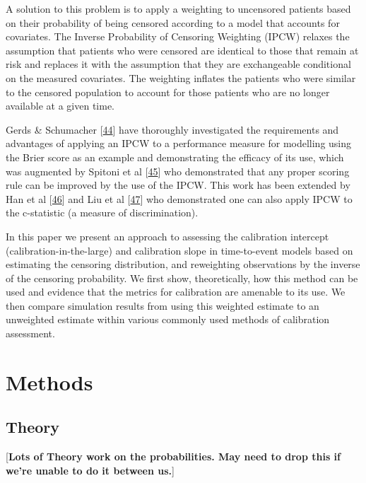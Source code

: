 \documentclass[12pt,PhD,twoside,openright]{muthesis}
\begin{document}
A solution to this problem is to apply a weighting to uncensored patients based on their probability of being censored according to a model that accounts for covariates. The Inverse Probability of Censoring Weighting (IPCW) relaxes the assumption that patients who were censored are identical to those that remain at risk and replaces it with the assumption that they are exchangeable conditional on the measured covariates. The weighting inflates the patients who were similar to the censored population to account for those patients who are no longer available at a given time.

Gerds \& Schumacher {[}\protect\hyperlink{ref-gerds_consistent_2006}{44}{]} have thoroughly investigated the requirements and advantages of applying an IPCW to a performance measure for modelling using the Brier score as an example and demonstrating the efficacy of its use, which was augmented by Spitoni et al {[}\protect\hyperlink{ref-spitoni_prediction_2018}{45}{]} who demonstrated that any proper scoring rule can be improved by the use of the IPCW. This work has been extended by Han et al {[}\protect\hyperlink{ref-han_comparing_2017}{46}{]} and Liu et al {[}\protect\hyperlink{ref-liu_comparing_2016}{47}{]} who demonstrated one can also apply IPCW to the c-statistic (a measure of discrimination).

In this paper we present an approach to assessing the calibration intercept (calibration-in-the-large) and calibration slope in time-to-event models based on estimating the censoring distribution, and reweighting observations by the inverse of the censoring probability. We first show, theoretically, how this method can be used and evidence that the metrics for calibration are amenable to its use. We then compare simulation results from using this weighted estimate to an unweighted estimate within various commonly used methods of calibration assessment.

\hypertarget{methods-4}{%
\section{Methods}\label{methods-4}}

\hypertarget{theory}{%
\subsection{Theory}\label{theory}}

{[}\textbf{Lots of Theory work on the probabilities. May need to drop this if we're unable to do it between us.}{]}
\end{document}
